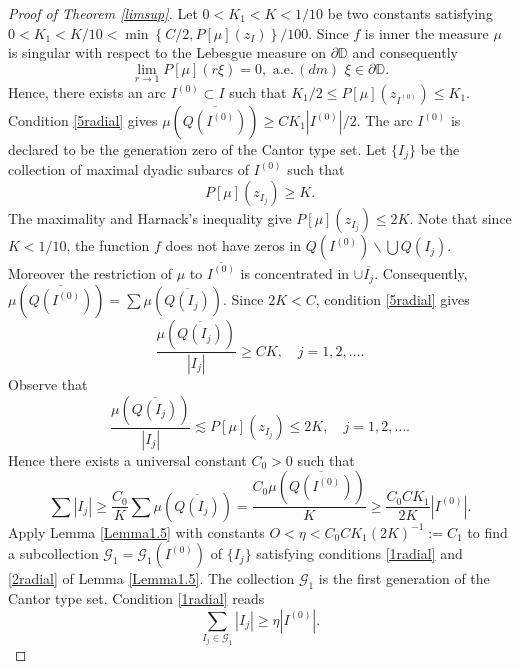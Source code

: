 \documentclass[a4paper,12pt]{article}
\theoremstyle{definition}
\numberwithin{equation}{section}
\newcommand{\D}{\mathbb D}
\begin{document}
\begin{proof}[Proof of Theorem \ref{limsup}]
Let $0<K_1 < K < 1/10$ be two constants satisfying $0<K_{1}< K / 10 <\min \left\{ C / 2, P [\mu] (z_{I}) \right\} / 100$. Since $f$ is inner the measure $\mu$ is singular with respect to the Lebesgue measure on $\partial \D$ and consequently
\begin{equation}
    \label{6radial}
    \lim_{r \rightarrow 1} P[\mu](r \xi)=0, \, \, \text{a.e.} \,  (d m) \,  \, \xi \in \partial \mathbb{D} . 
\end{equation}
Hence, there exists an arc $I^{(0)} \subset I$ such that $K_{1} / 2 \leq P[\mu] (z_{I^{(0)}}) \leq K_{1}$. Condition \eqref{5radial} gives $\mu\left(\overline{Q\left(I^{(0)} \right)}\right) \geq C K_{1} |I^{(0)}| / 2$. The arc $I^{(0)}$ is declared to be the generation zero of the Cantor type set. Let $\{I_j \}$ be the collection of maximal dyadic subarcs of $I^{(0)}$ such that
$$
P[\mu]\left(z_{I_{j}}\right) \geqslant K . 
$$
The maximality and Harnack's inequality give $P[\mu]\left(z_{I_{j}}\right) \leqslant 2 K$. Note that since $K<1 / 10$, the function $f$ does not have zeros in $Q\left(I^{(0)}\right) \backslash \bigcup Q\left(I_{j}\right)$. Moreover the restriction of $\mu$ to $\overline{I^{(0)}}$ is concentrated in $\cup \overline{I_j}$. Consequently, $\mu\left(\overline{Q\left(I^{(0)}\right)}\right)=\sum \mu\left(\overline{Q\left(I_{j}\right)}\right)$. Since $ 2K< C $, condition \eqref{5radial} gives 
\begin{equation}
\label{7radial}
\frac{\mu(\overline{Q(I_j)})}{|I_j|} \geqslant C K , \quad j=1,2,\ldots .
\end{equation}
Observe that 
$$
\frac{\mu\left(\overline{Q\left(I_{j}\right)}\right)}{\left|I_{j}\right|} \lesssim P [\mu] \left(z_{I_{j}}\right) \leqslant 2  K , \quad j=1,2,\ldots . 
$$
Hence there exists a universal constant $C_0 >0$ such that 
$$
\sum\left|I_{j}\right| \geqslant \frac{C_0}{  K} \sum \mu\left( \overline{Q\left(I_{j}\right)}\right)=\frac{C_0 \mu (\overline{Q (I^{(0)})})}{  K}  \geqslant \frac{C_0  C K_{1}}{2  K}\left|I^{(0)}\right| . 
$$
Apply Lemma \ref{Lemma1.5} with constants $O<\eta < C_0 C K_{1} (2  K)^{-1}:=C_{1}$ to find a subcollection $\mathcal{G}_{1}=\mathcal{G}_{1}\left(I^{(0)}\right)$ of $\{ I_{j}\} $ satisfying conditions \eqref{1radial} and \eqref{2radial} of Lemma \ref{Lemma1.5}. The collection $\mathcal{G}_1$ is the first generation of the Cantor type set. Condition \eqref{1radial} reads  
\begin{equation}
    \label{8radial}
    \sum_{I_j \in \mathcal{G}_1} |I_j| \geq \eta |I^{(0)}|.
\end{equation}

\end{proof}
\end{document}
